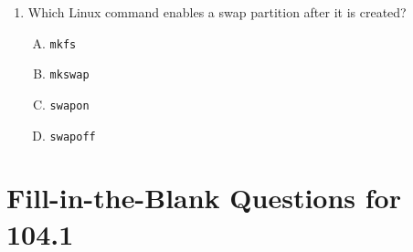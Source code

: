 \documentclass[a4paper]{report}
\begin{document}
\begin{enumerate}[1.]
    \item Which Linux command enables a swap partition after it is created?  
    \begin{enumerate}[A)]
        \item \texttt{mkfs}  
        \item \texttt{mkswap}  
        \item \texttt{swapon}  
        \item \texttt{swapoff}  
    \end{enumerate}

\end{enumerate}

\newpage
\section*{Fill-in-the-Blank Questions for 104.1}
\end{document}
